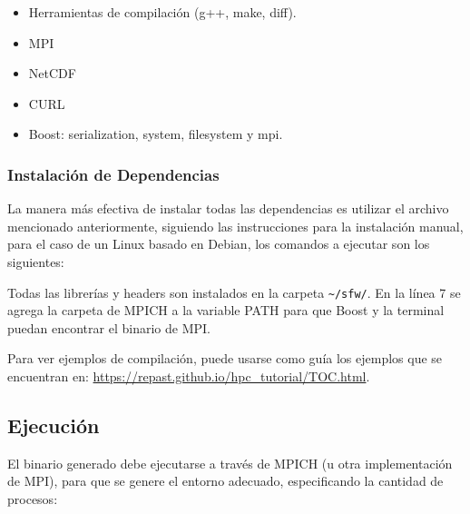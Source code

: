 \begin{itemize}
	\tightlist
	\item
	Herramientas de compilación (g++, make, diff).
	\item
	MPI
	\item
	NetCDF
	\item
	CURL
	\item
	Boost: serialization, system, filesystem y mpi.
\end{itemize}

\subsubsection{Instalación de Dependencias}

La manera más efectiva de instalar todas las dependencias es utilizar el
archivo mencionado anteriormente, siguiendo las instrucciones para la
instalación manual, para el caso de un Linux basado en Debian, los
comandos a ejecutar son los siguientes:

\begin{Shaded}
	\begin{Highlighting}[]
		
		\KeywordTok{\&\&} 
		
		 
	\end{Highlighting}
\end{Shaded}

Todas las librerías y headers son instalados en la carpeta
\texttt{\textasciitilde{}/sfw/}. En la línea 7 se agrega la carpeta de
MPICH a la variable PATH para que Boost y la terminal puedan encontrar
el binario de MPI.

Para ver ejemplos de compilación, puede usarse como guía los ejemplos
que se encuentran en:
\url{https://repast.github.io/hpc_tutorial/TOC.html}.

\subsection{Ejecución}

El binario generado debe ejecutarse a través de MPICH (u otra
implementación de MPI), para que se genere el entorno adecuado,
especificando la cantidad de procesos:

